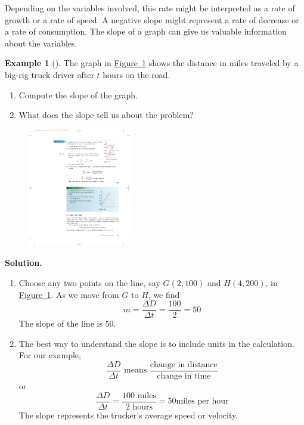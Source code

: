 \documentclass[10pt,]{book}
\theoremstyle{plain}
\theoremstyle{definition}
\theoremstyle{definition}
\newtheorem{example}[theorem]{Example}
\theoremstyle{definition}
\theoremstyle{definition}
\numberwithin{equation}{section}
\begin{document}
    Depending on the variables involved, this rate might be interpreted as a rate of growth or a rate of speed. A negative slope might represent a rate of decrease or a rate of consumption. The slope of a graph can give us valuable information about the variables.
%
\begin{example}[]\label{example-truck-speed}
The graph in \hyperref[fig-truck-speed]{Figure~\ref{fig-truck-speed}} shows the distance in miles traveled by a big-rig truck driver after \(t\) hours on the road. 
        \leavevmode%
\begin{enumerate}[label=*\alph**]
\item\hypertarget{li-147}{}Compute the slope of the graph.\item\hypertarget{li-148}{}What does the slope tell us about the problem?\end{enumerate}

\leavevmode%
\begin{figure}
\centering
\includegraphics[width=0.40\textwidth,]{images/fig-truck-speed.pdf}\caption{\label{fig-truck-speed}}
\end{figure}
\par\medskip\noindent%
\textbf{Solution.}\quad \leavevmode%
\begin{enumerate}[label=*\alph**]
\item\hypertarget{li-149}{}Choose any two points on the line, say \(G(2, 100)\) and \(H(4, 200)\), in \hyperref[fig-truck-speed]{Figure~\ref{fig-truck-speed}}. As we move from \(G\) to \(H\), we find
            \begin{equation*}m = \frac{\Delta D}{\Delta t}=\frac{100}{2}=50\end{equation*}
            The slope of the line is 50.\item\hypertarget{li-150}{}The best way to understand the slope is to include units in the calculation. For our example,
            \begin{equation*}\frac{\Delta D}{\Delta t} \text{ means } \frac{\text{change in distance}}{\text{change in time}}\end{equation*}
            or
            \begin{equation*}\frac{\Delta D}{\Delta t}
                =\frac{100 \text{ miles}}{2\text{ hours}}
                =50 \text{miles per hour}\end{equation*}
                The slope represents the trucker’s average speed or velocity.\end{enumerate}
\end{example}
\end{document}
